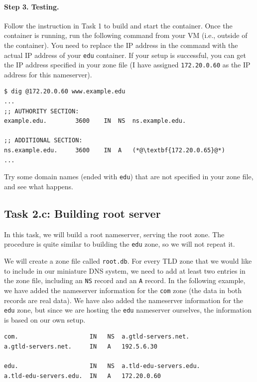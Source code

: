 \paragraph{Step 3. Testing.}
Follow the instruction in Task 1
to build and start the container. Once the container is running,
run the following command from your VM (i.e., outside of the
container). You  need to replace the IP address in the
command with the actual IP address of your 
\texttt{edu} container. If your
setup is successful, you can get the IP address specified
in your zone file (I have assigned \texttt{172.20.0.60} as the 
IP address for this nameserver).

\begin{lstlisting}
$ dig @172.20.0.60 www.example.edu
...
;; AUTHORITY SECTION:
example.edu.		3600	IN	NS	ns.example.edu.

;; ADDITIONAL SECTION:
ns.example.edu.		3600	IN	A	(*@\textbf{172.20.0.65}@*)
...
\end{lstlisting}


Try some domain names (ended with \texttt{edu}) that are not 
specified in your zone file, and see what happens. 




\subsection{Task 2.c: Building root server}

In this task, we will build a root nameserver, serving the 
root zone. The procedure is quite similar to building
the \texttt{edu} zone, so we will not repeat it.  


We will create a zone file called \texttt{root.db}. 
For every TLD zone that we would like to include in our 
miniature DNS system, we need to add at least two entries 
in the zone file, including an \texttt{NS} record 
and an \texttt{A} record.  In the following example,
we have added the nameserver information for the 
\texttt{com} zone (the data in both records are real data).
We have also added the nameserver information 
for the \texttt{edu} zone, but since we are 
hosting the \texttt{edu} nameserver ourselves, the 
information is based on our own setup.


\begin{lstlisting}
com.                    IN   NS  a.gtld-servers.net.
a.gtld-servers.net.     IN   A   192.5.6.30

edu.                    IN   NS  a.tld-edu-servers.edu.
a.tld-edu-servers.edu.  IN   A   172.20.0.60
\end{lstlisting}
 

